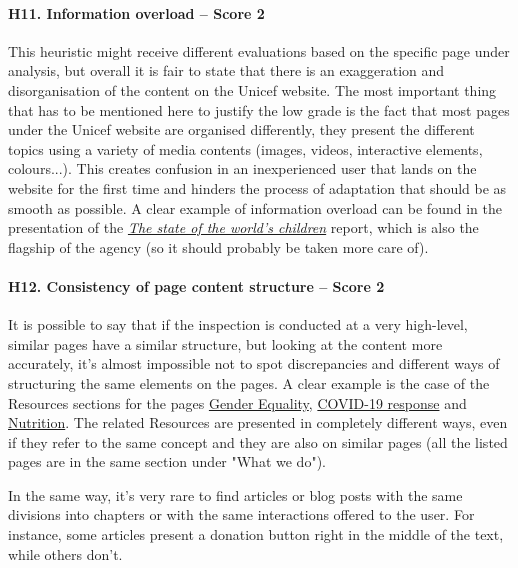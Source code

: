 \paragraph*{H11. Information overload – Score 2}
This heuristic might receive different evaluations based on the specific page under analysis, but overall it is fair to state that there is an exaggeration and disorganisation of the content on the Unicef website. The most important thing that has to be mentioned here to justify the low grade is the fact that most pages under the Unicef website are organised differently, they present the different topics using a variety of media contents (images, videos, interactive elements, colours...). This creates confusion in an inexperienced user that lands on the website for the first time and hinders the process of adaptation that should be as smooth as possible.
A clear example of information overload can be found in the presentation of the \href{https://www.unicef.org/reports/state-of-worlds-children}{\textit{The state of the world's children}} report, which is also the flagship of the agency (so it should probably be taken more care of).


\paragraph*{H12. Consistency of page content structure – Score 2}
It is possible to say that if the inspection is conducted at a very high-level, similar pages have a similar structure, but looking at the content more accurately, it's almost impossible not to spot discrepancies and different ways of structuring the same elements on the pages. 
A clear example is the case of the Resources sections for the pages \href{https://www.unicef.org/gender-equality}{Gender Equality}, \href{https://www.unicef.org/coronavirus/covid-19}{COVID-19 response} and \href{https://www.unicef.org/nutrition}{Nutrition}. The related Resources are presented in completely different ways, even if they refer to the same concept and they are also on similar pages (all the listed pages are in the same section under "What we do").

In the same way, it's very rare to find articles or blog posts with the same divisions into chapters or with the same interactions offered to the user. For instance, some articles present a donation button right in the middle of the text, while others don't.




